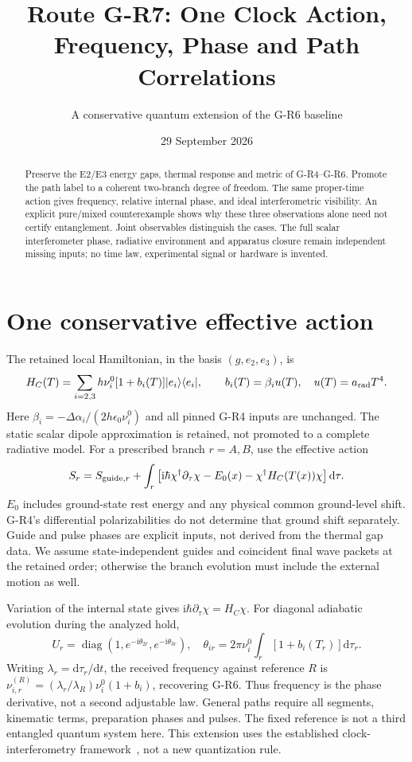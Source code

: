 \documentclass[11pt,a4paper]{article}
\title{Route G-R7: One Clock Action,\\Frequency, Phase and Path Correlations}
\author{A conservative quantum extension of the G-R6 baseline}
\date{29 September 2026}
\newcommand{\dd}{\mathrm d}
\newcommand{\ii}{\mathrm i}
\begin{document}
\maketitle
\begin{abstract}
Preserve the E2/E3 energy gaps, thermal response and metric of G-R4--G-R6.
Promote the path label to a coherent two-branch degree of freedom.
The same proper-time action gives frequency, relative internal phase,
and ideal interferometric visibility. An explicit pure/mixed counterexample
shows why these three observations alone need not certify entanglement.
Joint observables distinguish the cases. The full scalar interferometer
phase, radiative environment and apparatus closure remain independent
missing inputs; no time law, experimental signal or hardware is invented.
\end{abstract}

\section{One conservative effective action}
The retained local Hamiltonian, in the basis $(g,e_2,e_3)$, is
\begin{equation}
 H_C(T)=\sum_{i=2,3}h\nu_i^0[1+b_i(T)]|e_i\rangle\langle e_i|,
 \qquad b_i(T)=\beta_i u(T),\quad u(T)=a_{\rm rad}T^4 .
\end{equation}
Here $\beta_i=-\Delta\alpha_i/(2h\epsilon_0\nu_i^0)$ and all pinned
G-R4 inputs are unchanged. The static scalar dipole approximation is
retained, not promoted to a complete radiative model.
For a prescribed branch $r=A,B$, use the effective action
\begin{equation}\label{eq:action}
 S_r=S_{{\rm guide},r}+\int_r
 \left[\ii\hbar\chi^\dagger\partial_\tau\chi
       -E_0(x)-\chi^\dagger H_C(T(x))\chi\right]\dd\tau .
\end{equation}
$E_0$ includes ground-state rest energy and any physical common
ground-level shift. G-R4's differential polarizabilities do not determine
that ground shift separately. Guide and pulse phases are explicit inputs,
not derived from the thermal gap data. We assume state-independent
guides and coincident final wave packets at the retained order; otherwise
the branch evolution must include the external motion as well.

Variation of the internal state gives $\ii\hbar\partial_\tau\chi=H_C\chi$.
For diagonal adiabatic evolution during the analyzed hold,
\begin{equation}
 U_r=\operatorname{diag}(1,e^{-\ii\theta_{2r}},e^{-\ii\theta_{3r}}),
 \quad \theta_{ir}=2\pi\nu_i^0\int_r[1+b_i(T_r)]\dd\tau_r .
 \label{eq:phase}
\end{equation}
Writing $\lambda_r=\dd\tau_r/\dd t$, the received frequency against
reference $R$ is $\nu_{i,r}^{(R)}=(\lambda_r/\lambda_R)\nu_i^0(1+b_i)$,
recovering G-R6. Thus frequency is the phase derivative, not a second
adjustable law. General paths require all segments, kinematic terms,
preparation phases and pulses. The fixed reference is not a third
entangled quantum system here. This extension uses the established
clock-interferometry framework~\cite{zych,roura}, not a new quantization rule.
\end{document}
